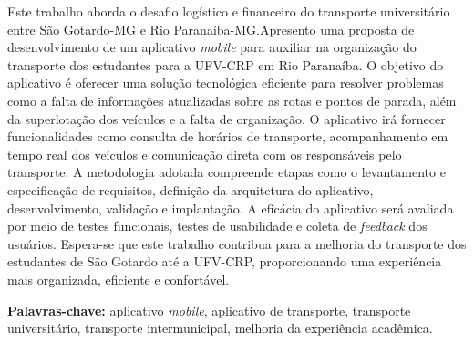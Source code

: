 \documentclass[
    12pt,                   %
    openright,              %
    oneside,                %
    a4paper,                %
    sumario=tradicional,    %
    english,                %
    brazil,                 %
    ]{abntex2}
\begin{document}
\begin{resumo}
     Este trabalho aborda o desafio logístico e financeiro do transporte universitário entre São Gotardo-MG e Rio Paranaíba-MG.Apresento uma proposta de desenvolvimento de um aplicativo \textit{mobile} para auxiliar na organização do transporte dos estudantes para a UFV-CRP em Rio Paranaíba. O objetivo do aplicativo é oferecer uma solução tecnológica eficiente para resolver problemas como a falta de informações atualizadas sobre as rotas e pontos de parada, além da superlotação dos veículos e a falta de organização. O aplicativo irá fornecer funcionalidades como consulta de horários de transporte, acompanhamento em tempo real dos veículos e comunicação direta com os responsáveis pelo transporte. A metodologia adotada compreende etapas como o levantamento e especificação de requisitos, definição da arquitetura do aplicativo, desenvolvimento, validação e implantação. A eficácia do aplicativo será avaliada por meio de testes funcionais, testes de usabilidade e coleta de \textit{feedback} dos usuários. Espera-se que este trabalho contribua para a melhoria do transporte dos estudantes de São Gotardo até a UFV-CRP, proporcionando uma experiência mais organizada, eficiente e confortável.

    \vspace{\onelineskip}
    
    \noindent\textbf{Palavras-chave:} aplicativo \textit{mobile}, aplicativo de transporte, transporte universitário, transporte intermunicipal, melhoria da experiência acadêmica.

\end{resumo}
\end{document}
